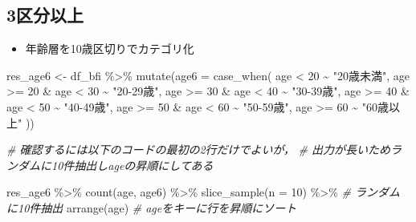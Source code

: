 \documentclass[
  xelatex,ja=standard, b5paper]{bxjsbook}
\newenvironment{Shaded}{\begin{snugshade}}{\end{snugshade}}
\newcommand{\AttributeTok}[1]{\textcolor[rgb]{0.77,0.63,0.00}{#1}}
\newcommand{\CommentTok}[1]{\textcolor[rgb]{0.56,0.35,0.01}{\textit{#1}}}
\newcommand{\DecValTok}[1]{\textcolor[rgb]{0.00,0.00,0.81}{#1}}
\newcommand{\FunctionTok}[1]{\textcolor[rgb]{0.00,0.00,0.00}{#1}}
\newcommand{\NormalTok}[1]{#1}
\newcommand{\OtherTok}[1]{\textcolor[rgb]{0.56,0.35,0.01}{#1}}
\newcommand{\SpecialCharTok}[1]{\textcolor[rgb]{0.00,0.00,0.00}{#1}}
\newcommand{\StringTok}[1]{\textcolor[rgb]{0.31,0.60,0.02}{#1}}
\providecommand{\tightlist}{%
  \setlength{\itemsep}{0pt}\setlength{\parskip}{0pt}}
\begin{document}
\hypertarget{ux533aux5206ux4ee5ux4e0a}{%
\subsection{3区分以上}\label{ux533aux5206ux4ee5ux4e0a}}

\begin{itemize}
\tightlist
\item
  年齢層を10歳区切りでカテゴリ化
\end{itemize}

\begin{Shaded}
\begin{Highlighting}[]
\NormalTok{res\_age6 }\OtherTok{\textless{}{-}} 
\NormalTok{  df\_bfi }\SpecialCharTok{\%\textgreater{}\%} 
  \FunctionTok{mutate}\NormalTok{(}\AttributeTok{age6 =} \FunctionTok{case\_when}\NormalTok{(}
\NormalTok{    age }\SpecialCharTok{\textless{}} \DecValTok{20}              \SpecialCharTok{\textasciitilde{}} \StringTok{"20歳未満"}\NormalTok{, }
\NormalTok{    age }\SpecialCharTok{\textgreater{}=} \DecValTok{20}  \SpecialCharTok{\&}\NormalTok{ age }\SpecialCharTok{\textless{}} \DecValTok{30} \SpecialCharTok{\textasciitilde{}} \StringTok{"20{-}29歳"}\NormalTok{, }
\NormalTok{    age }\SpecialCharTok{\textgreater{}=} \DecValTok{30}  \SpecialCharTok{\&}\NormalTok{ age }\SpecialCharTok{\textless{}} \DecValTok{40} \SpecialCharTok{\textasciitilde{}} \StringTok{"30{-}39歳"}\NormalTok{,}
\NormalTok{    age }\SpecialCharTok{\textgreater{}=} \DecValTok{40}  \SpecialCharTok{\&}\NormalTok{ age }\SpecialCharTok{\textless{}} \DecValTok{50} \SpecialCharTok{\textasciitilde{}} \StringTok{"40{-}49歳"}\NormalTok{,}
\NormalTok{    age }\SpecialCharTok{\textgreater{}=} \DecValTok{50}  \SpecialCharTok{\&}\NormalTok{ age }\SpecialCharTok{\textless{}} \DecValTok{60} \SpecialCharTok{\textasciitilde{}} \StringTok{"50{-}59歳"}\NormalTok{,}
\NormalTok{    age }\SpecialCharTok{\textgreater{}=} \DecValTok{60}             \SpecialCharTok{\textasciitilde{}} \StringTok{"60歳以上"}  
\NormalTok{  ))}

\CommentTok{\# 確認するには以下のコードの最初の2行だけでよいが，}
\CommentTok{\# 出力が長いためランダムに10件抽出しageの昇順にしてある}

\NormalTok{res\_age6 }\SpecialCharTok{\%\textgreater{}\%} 
  \FunctionTok{count}\NormalTok{(age, age6) }\SpecialCharTok{\%\textgreater{}\%} 
  \FunctionTok{slice\_sample}\NormalTok{(}\AttributeTok{n =} \DecValTok{10}\NormalTok{) }\SpecialCharTok{\%\textgreater{}\%} \CommentTok{\# ランダムに10件抽出}
  \FunctionTok{arrange}\NormalTok{(age)             }\CommentTok{\# ageをキーに行を昇順にソート}
\end{Highlighting}
\end{Shaded}
\end{document}
